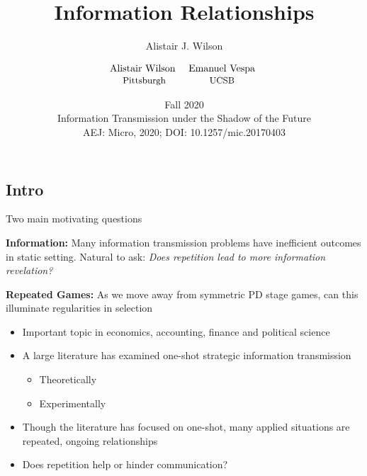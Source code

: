 \documentclass{beamer}
\author{Alistair J. Wilson }
\date{Fall 2020\\ Information Transmission under the Shadow of the Future\\AEJ: Micro, 2020; DOI: 10.1257/mic.20170403}
\begin{document}
\title{Information Relationships}
\author{$\begin{array}{cc} \text{Alistair Wilson } & \text{Emanuel Vespa
}
\\ \text{\small Pittsburgh} & \text{\small UCSB }\end{array}$  }


\maketitle

\subsection{Intro}
\begin{frame}{Two main motivating questions}
\begin{card}
\textbf{Information:} Many information transmission problems have inefficient outcomes in static setting. Natural to ask:
\emph{Does repetition lead to more information revelation?}
\end{card}
\begin{card}
\textbf{Repeated Games:} As we move away from symmetric PD stage games, can this illuminate regularities in selection
\end{card}
\end{frame}

\begin{frame}
\begin{card}
    \begin{itemize}
    \item Important topic in economics, accounting, finance and political science
    \item A large literature has examined one-shot strategic information transmission
        \begin{itemize}
            \item Theoretically
            \item Experimentally
        \end{itemize}
    \item Though the literature has focused on one-shot, many applied situations are repeated, ongoing relationships
    \item Does repetition help or hinder communication?
    \end{itemize}
\end{card}
\end{frame}
\end{document}
